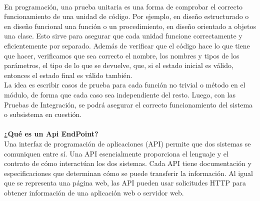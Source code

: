 \begin{flushleft}
\textbf{}\\
En programación, una prueba unitaria es una forma de comprobar el correcto funcionamiento de una unidad de código. Por ejemplo, en diseño estructurado o en diseño funcional una función o un procedimiento, en diseño orientado a objetos una clase. Esto sirve para asegurar que cada unidad funcione correctamente y eficientemente por separado. Además de verificar que el código hace lo que tiene que hacer, verificamos que sea correcto el nombre, los nombres y tipos de los parámetros, el tipo de lo que se devuelve, que, si el estado inicial es válido, entonces el estado final es válido también.
\textbf{}\\
La idea es escribir casos de prueba para cada función no trivial o método en el módulo, de forma que cada caso sea independiente del resto. Luego, con las Pruebas de Integración, se podrá asegurar el correcto funcionamiento del sistema o subsistema en cuestión.
\textbf{}\\
\textbf{}\\
\textbf {¿Qué es un Api EndPoint?}
\textbf{}\\
Una interfaz de programación de aplicaciones (API) permite que dos sistemas se comuniquen entre sí. Una API esencialmente proporciona el lenguaje y el contrato de cómo interactúan los dos sistemas. Cada API tiene documentación y especificaciones que determinan cómo se puede transferir la información.
Al igual que se representa una página web, las API pueden usar solicitudes HTTP para obtener información de una aplicación web o servidor web.  



 

\end{flushleft}